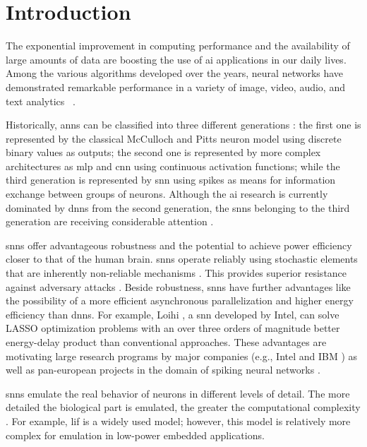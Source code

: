 \section{Introduction}
\label{sec:introduction}
The exponential improvement in computing performance and the availability of large amounts of data are boosting the use of \gls{ai} applications in our daily lives. Among the various algorithms developed over the years, neural networks have demonstrated remarkable performance in a variety of image, video, audio, and text analytics ~\cite{schmidhuber2015deep,Taigman_2014_CVPR}. 

Historically, \glspl{ann} can be classified into three different generations \cite{Design_Exploration_SbS_Trans20}: the first one is represented by the classical McCulloch and Pitts neuron model using discrete binary values as outputs; the second one is represented by more complex architectures as \gls{mlp} and \gls{cnn} using continuous activation functions; while the third generation is represented by \gls{snn} using spikes as means for information exchange between groups of neurons. Although the \gls{ai} research is currently dominated by \glspl{dnn} from the second generation, the \glspl{snn} belonging to the third generation are receiving considerable attention \cite{Spinnaker_Trans13,ernst2007efficient,Design_Exploration_SbS_Trans20, SNN_Survey_Trans19}.

\glspl{snn} offer advantageous robustness and the potential to achieve power efficiency closer to that of the human brain.
\glspl{snn} operate reliably using stochastic elements that are inherently non-reliable mechanisms \cite{mcdonnell2011benefits}.
This provides superior resistance against adversary attacks
\cite{ernst2007efficient, Dapello2020.06.16.154542}. Beside
robustness, \glspl{snn} have further advantages like the possibility of a more efficient asynchronous parallelization and higher
energy efficiency than \glspl{dnn}. For
example, Loihi \cite{davies2018loihi}, a \gls{snn} developed by Intel, can
solve LASSO optimization problems with an over three orders of
magnitude better energy-delay product than conventional
approaches. These advantages are motivating large research programs by
major companies (e.g., Intel \cite{davies2018loihi} and IBM
\cite{TrueNorth_Trans15}) as well as pan-european projects in the
domain of spiking neural networks \cite{Spinnaker_Trans13}.


\glspl{snn} emulate the real behavior of neurons in different levels of detail. The more detailed the biological part is emulated, the greater the computational complexity \cite{izhikevich2004model,amunts2019human}. For example, \gls{lif} is a widely used model; however, this model is relatively more complex for emulation in low-power embedded applications.
	
